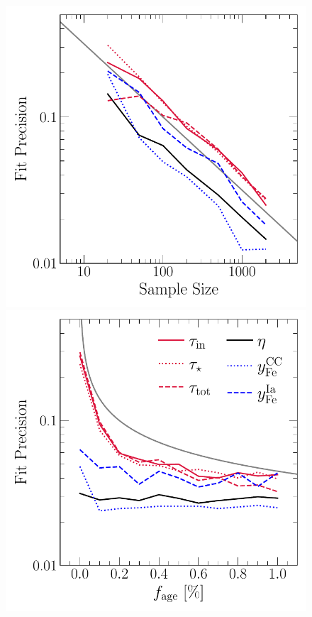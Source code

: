 \begin{figure}
\centering
\includegraphics[scale = 0.55]{precision_samplesize.pdf}
\includegraphics[scale = 0.55]{precision_agefrac.pdf}

\end{figure}
